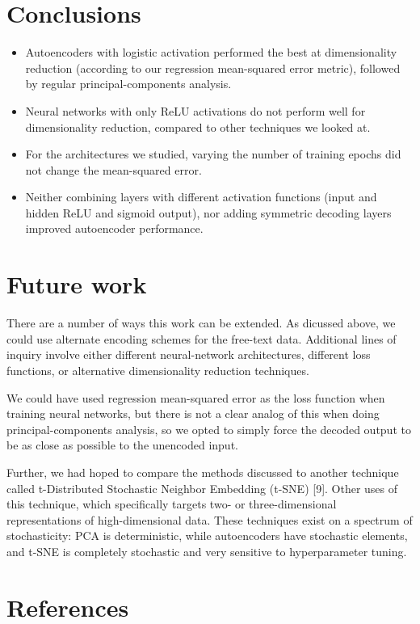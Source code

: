 \documentclass{article}
\begin{document}
\section{Conclusions}
\begin{itemize}
\item Autoencoders with logistic activation performed the best at dimensionality reduction (according to our regression mean-squared error metric), followed by regular principal-components analysis.
\item Neural networks with only ReLU activations do not perform well for dimensionality reduction, compared to other techniques we looked at.
\item For the architectures we studied, varying the number of training epochs did not change the mean-squared error. 
\item Neither combining layers with different activation functions (input and hidden ReLU and sigmoid output), nor adding symmetric decoding layers improved autoencoder performance.
\end{itemize}
\section{Future work}

There are a number of ways this work can be extended. As dicussed above, we could use alternate encoding schemes for the free-text data. Additional lines of inquiry involve either different neural-network architectures, different loss functions, or alternative dimensionality reduction techniques.

We could have used regression mean-squared error as the loss function when training neural networks, but there is not a clear analog of this when doing principal-components analysis, so we opted to simply force the decoded output to be as close as possible to the unencoded input.

Further, we had hoped to compare the methods discussed to another technique called t-Distributed Stochastic Neighbor Embedding (t-SNE) [9]. Other uses of this technique, which specifically targets two- or three-dimensional representations of high-dimensional data. These techniques exist on a spectrum of stochasticity: PCA is deterministic, while autoencoders have stochastic elements, and t-SNE is completely stochastic and very sensitive to hyperparameter tuning.

\section*{References}
\small
\end{document}
